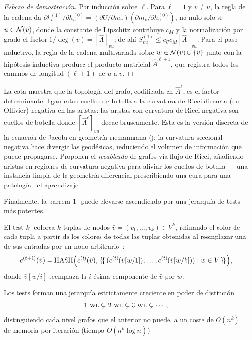 \begin{proof}[Esbozo de demostraci\'on]
Por inducci\'on sobre $\ell$. Para $\ell = 1$ y $v \neq u$, la regla de la cadena
da $\partial h_v^{(1)} / \partial h_u^{(0)}
= (\partial U / \partial m_v)(\partial m_v / \partial h_u^{(0)})$, no nulo solo si
$u \in \mathcal{N}(v)$, donde la constante de Lipschitz contribuye $c_M$ y la
normalizaci\'on por grado el factor $1/\deg(v) = [\hat A]_{vu}$; de ah\'i
$S_{vu}^{(1)} \le c_U c_M [\hat A]_{vu}$. Para el paso inductivo, la regla de la
cadena multivariada sobre $w \in \mathcal{N}(v) \cup \{v\}$ junto con la hip\'otesis
inductiva produce el producto matricial $\hat A^{\ell+1}$, que registra todos los
caminos de longitud $(\ell+1)$ de $u$ a $v$.
\end{proof}

La cota muestra que la topolog\'ia del grafo, codificada en $\hat A^\ell$, es el
factor determinante. \citet{topping2022understanding} ligan estos cuellos de
botella a la curvatura de Ricci discreta (de Ollivier) negativa en las aristas:
las aristas con curvatura de Ricci negativa son cuellos de botella donde
$[\hat A^\ell]_{vu}$ decae bruscamente. Esta es la versi\'on discreta de la
ecuaci\'on de Jacobi en geometr\'ia riemanniana (): la
curvatura seccional negativa hace divergir las geod\'esicas, reduciendo el volumen
de informaci\'on que puede propagarse. Proponen el \emph{recableado} de grafos
v\'ia flujo de Ricci, a\~nadiendo aristas en regiones de curvatura negativa para
aliviar los cuellos de botella --- una instancia limpia de la geometr\'ia
diferencial prescribiendo una cura para una patolog\'ia del aprendizaje.

Finalmente, la barrera $1$-\WL{} puede elevarse ascendiendo por una jerarqu\'ia de
tests m\'as potentes.

\begin{definition}
\label{def:graphs:k-wl}
El test \emph{$k$-\WL} colorea $k$-tuplas de nodos
$\bar v = (v_1, \dots, v_k) \in V^k$, refinando el color de cada tupla a partir de
los colores de todas las tuplas obtenidas al reemplazar una de sus entradas por un
nodo arbitrario~\citep{morris2019weisfeiler}:
\[
  c^{(t+1)}(\bar v) = \operatorname{HASH}\!\Big(c^{(t)}(\bar v),\,
    \{\!\{\, (c^{(t)}(\bar v[w/1]), \dots, c^{(t)}(\bar v[w/k])) : w \in V \,\}\!\}\Big),
\]
donde $\bar v[w/i]$ reemplaza la $i$-\'esima componente de $\bar v$ por $w$.
\end{definition}

\begin{proposition}
\label{prop:graphs:k-wl}
Los tests forman una jerarqu\'ia estrictamente creciente en poder de distinci\'on,
\[
  1\text{-}\textsc{wl} \subsetneq 2\text{-}\textsc{wl} \subsetneq 3\text{-}\textsc{wl} \subsetneq \cdots,
\]
distinguiendo cada nivel grafos que el anterior no puede, a un coste de $O(n^k)$
de memoria por iteraci\'on (tiempo $O(n^k \log n)$).
\end{proposition}

